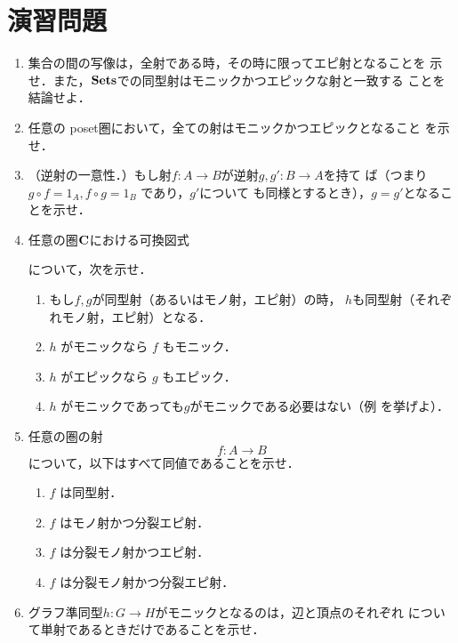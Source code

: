 \section{演習問題}
\begin{enumerate}
 \item 集合の間の写像は，全射である時，その時に限ってエピ射となることを
       示せ．また，$\mathbf{Sets}$での同型射はモニックかつエピックな射と一致する
       ことを結論せよ．
 \item 任意の poset圏において，全ての射はモニックかつエピックとなること
       を示せ．
 \item （逆射の一意性．）もし射$f: A \to B$が逆射$g, g': B \to A$を持て
       ば（つまり$g \circ f = 1_A, f \circ g = 1_B$ であり，$g'$について
       も同様とするとき），$g = g'$となることを示せ．
 \item 任意の圏${\bf C}$における可換図式
       \begin{center}
       \end{center}
       について，次を示せ．
       \begin{enumerate}
	\item もし$f, g$が同型射（あるいはモノ射，エピ射）の時，
	      $h$も同型射（それぞれモノ射，エピ射）となる．
	\item $h$ がモニックなら $f$ もモニック．
	\item $h$ がエピックなら $g$ もエピック．
	\item $h$ がモニックであっても$g$がモニックである必要はない（例
	      を挙げよ）．
       \end{enumerate}
 \item 任意の圏の射
       \[
	f: A \to B
       \]
       について，以下はすべて同値であることを示せ．
       \begin{enumerate}
	\item $f$ は同型射．
	\item $f$ はモノ射かつ分裂エピ射．
	\item $f$ は分裂モノ射かつエピ射．
	\item $f$ は分裂モノ射かつ分裂エピ射．
       \end{enumerate}
 \item グラフ準同型$h: G \to H$がモニックとなるのは，辺と頂点のそれぞれ
       について単射であるときだけであることを示せ．

\end{enumerate}
